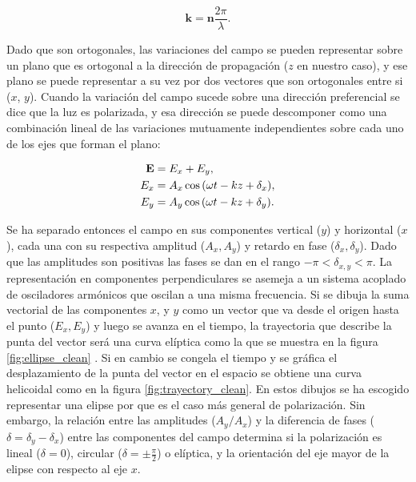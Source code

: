 $$\mathbf{k} = \mathbf{n} \frac{2\pi}{\lambda}.$$

Dado que son ortogonales, las variaciones del campo se pueden
representar sobre un plano que es 
ortogonal a la dirección de propagación ($z$ en nuestro caso), y ese plano se puede
representar a su vez por dos vectores que son ortogonales entre si
($x$, $y$).
Cuando la variación del campo sucede sobre una dirección preferencial
se dice que la luz es polarizada, y esa dirección se puede descomponer
como una combinación lineal de las variaciones mutuamente independientes
sobre cada uno de los ejes que forman el plano:

\begin{align}
\mathbf{E} &= E_x +E_y, \notag\\
E_x &= A_x\cos{ \left(\omega t -kz+\delta_x\right)} \label{eq:xcomp},\\
E_y &= A_y\cos{ \left(\omega t -kz+\delta_y\right)}\label{eq:ycomp}.
\end{align}

Se ha separado entonces el campo en sus componentes vertical ($y$) y
horizontal ($x$), cada una con su respectiva amplitud ($A_x,A_y$) y
retardo en fase ($\delta_x,\delta_y$). Dado que las amplitudes son
positivas las fases se dan en el rango $-\pi<\delta_{x,y}<\pi$.
La representación en componentes perpendiculares se asemeja a un
sistema acoplado de osciladores armónicos que oscilan a una misma
frecuencia. Si se dibuja la suma vectorial de las componentes $x$, y $y$ como
un vector que va desde el origen hasta el punto ($E_x,E_y$) y luego se
avanza en el tiempo, la trayectoria que describe la punta del vector
será una curva elíptica como la que 
se muestra en la figura \ref{fig:ellipse_clean} . Si en cambio se congela el tiempo y se gráfica
el desplazamiento de la punta del vector en el espacio se obtiene una curva
helicoidal como en la figura \ref{fig:trayectory_clean}. En estos dibujos se ha
escogido representar una elipse por que es el caso más general de polarización. Sin
embargo, la relación entre las amplitudes ($A_y/A_x$) y la
diferencia de fases ($\delta = \delta_y-\delta_x$) entre las componentes del
campo determina si la polarización es lineal ($\delta = 0$), circular
($\delta =\pm \frac{\pi}{2}$) o elíptica, y la orientación del eje
mayor de la elipse con respecto al eje $x$.

